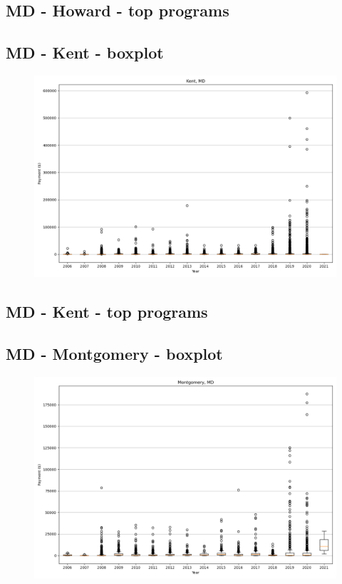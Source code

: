 \subsection*{MD - Howard - top programs}

\newpage
\subsection*{MD - Kent - boxplot}
\begin{figure}[h]
\centering
\includegraphics[width=7in]{../output/boxplots/counties/Kent-MD_boxplot.png}
\end{figure}


\subsection*{MD - Kent - top programs}

\newpage
\subsection*{MD - Montgomery - boxplot}
\begin{figure}[h]
\centering
\includegraphics[width=7in]{../output/boxplots/counties/Montgomery-MD_boxplot.png}
\end{figure}


